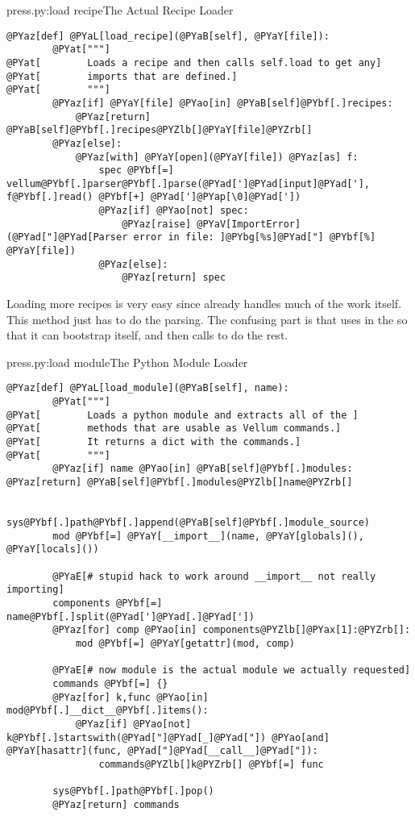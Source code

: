 \begin{code}{press.py:load recipe}{The Actual Recipe Loader}
\begin{Verbatim}[commandchars=@\[\]]
    @PYaz[def] @PYaL[load_recipe](@PYaB[self], @PYaY[file]):
        @PYat["""]
@PYat[        Loads a recipe and then calls self.load to get any]
@PYat[        imports that are defined.]
@PYat[        """]
        @PYaz[if] @PYaY[file] @PYao[in] @PYaB[self]@PYbf[.]recipes:
            @PYaz[return] @PYaB[self]@PYbf[.]recipes@PYZlb[]@PYaY[file]@PYZrb[]
        @PYaz[else]:
            @PYaz[with] @PYaY[open](@PYaY[file]) @PYaz[as] f:
                spec @PYbf[=] vellum@PYbf[.]parser@PYbf[.]parse(@PYad[']@PYad[input]@PYad['], f@PYbf[.]read() @PYbf[+] @PYad[']@PYap[\0]@PYad['])
                @PYaz[if] @PYao[not] spec:
                    @PYaz[raise] @PYaV[ImportError](@PYad["]@PYad[Parser error in file: ]@PYbg[%s]@PYad["] @PYbf[%] @PYaY[file])
                @PYaz[else]:
                    @PYaz[return] spec
\end{Verbatim}

\end{code}

Loading more recipes is very easy since  already handles much of
the work itself.  This method just has to do the parsing.  The confusing part is
that  uses  in the  so that it
can bootstrap itself, and then calls  to do the rest.

\begin{code}{press.py:load module}{The Python Module Loader}
\begin{Verbatim}[commandchars=@\[\]]
    @PYaz[def] @PYaL[load_module](@PYaB[self], name):
        @PYat["""]
@PYat[        Loads a python module and extracts all of the ]
@PYat[        methods that are usable as Vellum commands.]
@PYat[        It returns a dict with the commands.]
@PYat[        """]
        @PYaz[if] name @PYao[in] @PYaB[self]@PYbf[.]modules: @PYaz[return] @PYaB[self]@PYbf[.]modules@PYZlb[]name@PYZrb[]

        sys@PYbf[.]path@PYbf[.]append(@PYaB[self]@PYbf[.]module_source)
        mod @PYbf[=] @PYaY[__import__](name, @PYaY[globals](), @PYaY[locals]())

        @PYaE[# stupid hack to work around __import__ not really importing]
        components @PYbf[=] name@PYbf[.]split(@PYad[']@PYad[.]@PYad['])
        @PYaz[for] comp @PYao[in] components@PYZlb[]@PYax[1]:@PYZrb[]:
            mod @PYbf[=] @PYaY[getattr](mod, comp)

        @PYaE[# now module is the actual module we actually requested]
        commands @PYbf[=] {}
        @PYaz[for] k,func @PYao[in] mod@PYbf[.]__dict__@PYbf[.]items():
            @PYaz[if] @PYao[not] k@PYbf[.]startswith(@PYad["]@PYad[_]@PYad["]) @PYao[and] @PYaY[hasattr](func, @PYad["]@PYad[__call__]@PYad["]):
                commands@PYZlb[]k@PYZrb[] @PYbf[=] func

        sys@PYbf[.]path@PYbf[.]pop()
        @PYaz[return] commands
\end{Verbatim}

\end{code}

